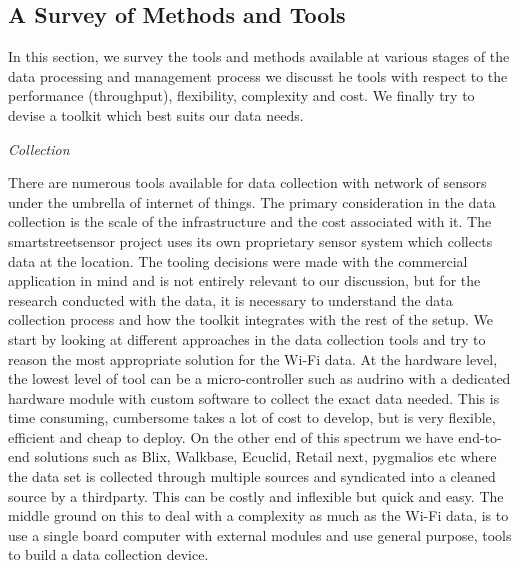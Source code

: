 
\subsection{A Survey of Methods and Tools}

In this section, we survey the tools and methods available at various stages of the data processing and management process we discusst he tools with respect to the performance (throughput), flexibility, complexity and cost.
We finally try to devise a toolkit which best suits our data needs.


\vspace{1.5em}\noindent\textit{Collection}\vspace{0.5em}

There are numerous tools available for data collection with network of sensors under the umbrella of internet of things.
The primary consideration in the data collection is the scale of the infrastructure and the cost associated with it.
The smartstreetsensor project uses its own proprietary sensor system which collects data at the location.
The tooling decisions were made with the commercial application in mind and is not entirely relevant to our discussion, but for the research conducted with the data, it is necessary to understand the data collection process and how the toolkit integrates with the rest of the setup.
We start by looking at different approaches in the data collection tools and try to reason the most appropriate solution for the Wi-Fi data.
At the hardware level, the lowest level of tool can be a micro-controller such as audrino with a dedicated hardware module with custom software to collect the exact data needed.
This is time consuming, cumbersome takes a lot of cost to develop, but is very flexible, efficient and cheap to deploy.
On the other end of this spectrum we have end-to-end solutions such as Blix, Walkbase, Ecuclid, Retail next, pygmalios etc where the data set is collected through multiple sources and syndicated into a cleaned source by a thirdparty.
This can be costly and inflexible but quick and easy.
The middle ground on this to deal with a complexity as much as the Wi-Fi data, is to use a single board computer with external modules and use general purpose, tools to build a data collection device.

